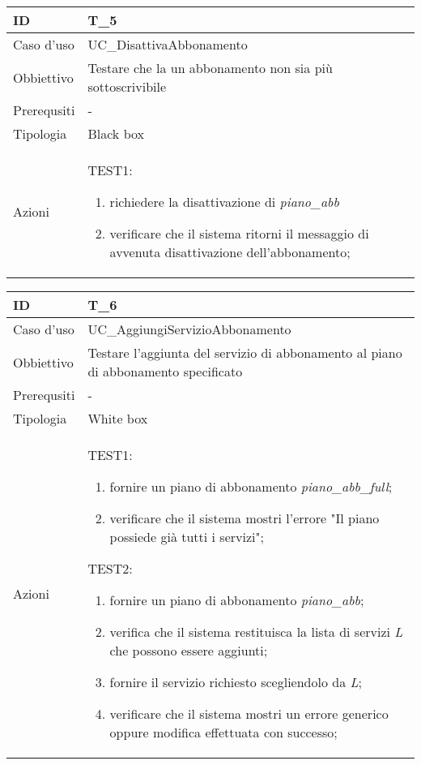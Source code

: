 \begin{table}[hb]
    \centering
    \begin{tabular}{ |p{2cm}|p{10cm}|  }
        \hline
        ID & T\_5 \\\hline
        Caso d'uso & UC\_DisattivaAbbonamento \\\hline   
        Obbiettivo & Testare che la un abbonamento non sia più sottoscrivibile  \\\hline
        Prerequsiti & - \\\hline
        Tipologia & Black box \\\hline
        Azioni & 
        TEST1:
        \begin{enumerate}[topsep=0pt]
            \item richiedere la disattivazione di \emph{piano\_abb}
            \item verificare che il sistema ritorni il messaggio di avvenuta disattivazione dell'abbonamento;
        \end{enumerate}
        \\\hline
    \end{tabular}
\end{table}

\begin{table}[hb]
    \centering
    \begin{tabular}{ |p{2cm}|p{10cm}|  }
        \hline
        ID & T\_6 \\\hline
        Caso d'uso & UC\_AggiungiServizioAbbonamento \\\hline   
        Obbiettivo & Testare l'aggiunta del servizio di abbonamento al piano di abbonamento specificato \\\hline
        Prerequsiti & - \\\hline
        Tipologia & White box \\\hline
        Azioni & 
        TEST1:
        \begin{enumerate}[topsep=0pt]
            \item fornire un piano di abbonamento \emph{piano\_abb\_full};
            \item verificare che il sistema mostri l'errore "Il piano possiede già tutti i servizi";
        \end{enumerate}
        \vspace{0.5cm} TEST2:
        \begin{enumerate}[topsep=0pt]
            \item fornire un piano di abbonamento \emph{piano\_abb};
            \item verifica che il sistema restituisca la lista di servizi \emph{L} che possono essere aggiunti;
            \item fornire il servizio richiesto scegliendolo da \emph{L};
            \item verificare che il sistema mostri un errore generico oppure modifica effettuata con successo;
        \end{enumerate}
        \\\hline
    \end{tabular}
\end{table}

